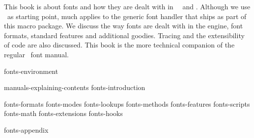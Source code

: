 
%
%

%


\enablemode[simple] %

\startbuffer[abstract]

    This book is about fonts and how they are dealt with in \CONTEXT\ \MKIV\ and
    \LUATEX. Although we use \CONTEXT\ as starting point, much applies to the
    generic font handler that ships as part of this macro package. We discuss the
    way fonts are dealt with in the engine, font formats, standard features and
    additional goodies. Tracing and the extensibility of code are also discussed.
    This book is the more technical companion of the regular \CONTEXT\ font
    manual.

\stopbuffer

\environment fonts-environment

\startdocument
  [author=Hans Hagen,
   title=Fonts out of \ConTeXt,
   subtitle=explaining luatex and mkiv,
   affiliation=PRAGMA ADE,
   comment=work in progress,
   cover:color:1=darkred,
   cover:color:2=darkgreen,
   cover:color:3=darkblue,
   cover:color:4=darkyellow,
   cover:color:5=darkgray]

    \startfrontmatter
        \component manuals-explaining-contents
        \component fonts-introduction
    \stopfrontmatter

    \startbodymatter
        \component fonts-formats
        \component fonts-modes
        \component fonts-lookups
        \component fonts-methods
        \component fonts-features
        \component fonts-scripts
        \component fonts-math
        \component fonts-extensions
        \component fonts-hooks
    \stopbodymatter

    \startappendices
        \component fonts-appendix
    \stopappendices

\stopdocument
